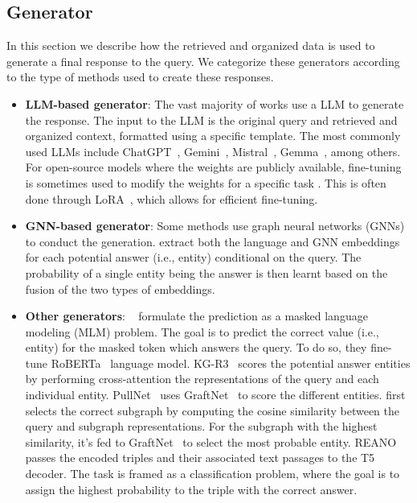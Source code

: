 \begin{itemize}[leftmargin=*]
\end{itemize}

\subsection{Generator}

In this section we describe how the retrieved and organized data is used to generate a final response to the query. We categorize these generators according to the type of methods used to create these responses.

\begin{itemize}[leftmargin=*]
\item {\bf LLM-based generator}: The vast majority of works use a LLM to generate the response. The input to the LLM is the original query and retrieved and organized context, formatted using a specific template. The most commonly used LLMs include ChatGPT~\cite{chatgpt_paper}, Gemini~\cite{team2023gemini}, Mistral~\cite{jiang2023mistral}, Gemma~\cite{team2024gemma}, among others. For open-source models where the weights are publicly available, fine-tuning is sometimes used to modify the weights for a specific task \cite{unioqa, zhu2024knowagent}. This is often done through LoRA~\cite{hulora}, which allows for efficient fine-tuning.

\item {\bf GNN-based generator}: Some methods use graph neural networks (GNNs)~\cite{kipfgcn} to conduct the generation. \citet{yasunaga2021qa, taunk2023grapeqa, feng2020scalable} extract both the language and GNN embeddings for each potential answer (i.e., entity) conditional on the query. The probability of a single entity being the answer is then learnt based on the fusion of the two types of embeddings.



\item {\bf Other generators}: ~\citet{zhanggreaselm, yasunaga2022deep, hu2022empowering} formulate the prediction as a masked language modeling (MLM) problem. The goal is to predict the correct value (i.e., entity) for the masked token which answers the query. To do so, they fine-tune RoBERTa~\cite{liu2019roberta} language model. KG-R3~\cite{pahuja2023retrieve} scores the potential answer entities by performing cross-attention the representations of the query and each individual entity.
PullNet~\cite{pullnet} uses GraftNet~\cite{sun2018open} to score the different entities. \citet{gao2022graph} first selects the correct subgraph by computing the cosine similarity between the query and subgraph representations. For the subgraph with the highest similarity, it's fed to GraftNet~\cite{sun2018open} to select the most probable entity. REANO~\cite{fang2024reano} passes the encoded triples and their associated text passages to the T5 decoder. The task is framed as a classification problem, where the goal is to assign the highest probability to the triple with the correct answer.
\end{itemize}

